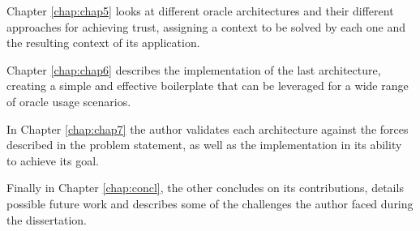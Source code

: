 Chapter \ref{chap:chap5} looks at different oracle architectures and their different approaches for achieving trust, assigning a context to be solved by each one and the resulting context of its application.

Chapter \ref{chap:chap6} describes the implementation of the last architecture, creating a simple and effective boilerplate that can be leveraged for a wide range of oracle usage scenarios.

In Chapter \ref{chap:chap7} the author validates each architecture against the forces described in the problem statement, as well as the implementation in its ability to achieve its goal.

Finally in Chapter \ref{chap:concl}, the other concludes on its contributions, details possible future work and describes some of the challenges the author faced during the dissertation.